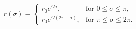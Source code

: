 \begin{equation}
r(\sigma) = \left\{ \begin{array}{rl}   r_0e^{\Omega\sigma}, & 
\mbox{for $0 \le \sigma \le \pi$}, \\
r_0e^{\Omega(2\pi-\sigma)},
 & \mbox{for $\pi \le \sigma \le 2\pi$}. 
\end{array} \right.
\label{fcs}\end{equation}

